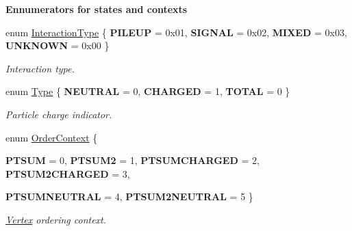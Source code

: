 \begin{Indent}{\bf Ennumerators for states and contexts}\par
\begin{CompactItemize}
\item 
enum \hyperlink{classVertex_0d80a5c5ed3bd9be72a325aa448eca25}{Interaction\-Type} \{ \textbf{PILEUP} =  0x01, 
\textbf{SIGNAL} =  0x02, 
\textbf{MIXED} =  0x03, 
\textbf{UNKNOWN} =  0x00
 \}
\begin{CompactList}\small\item\em Interaction type. \item\end{CompactList}\item 
enum \hyperlink{classVertex_ca819079d9d940f86b1f6ea1469aed20}{Type} \{ \textbf{NEUTRAL} =  0, 
\textbf{CHARGED} =  1, 
\textbf{TOTAL} =  0
 \}
\begin{CompactList}\small\item\em Particle charge indicator. \item\end{CompactList}\item 
enum \hyperlink{classVertex_40a06cc3fde98913c8259e3c11cd37ec}{Order\-Context} \{ \par
\textbf{PTSUM} =  0, 
\textbf{PTSUM2} =  1, 
\textbf{PTSUMCHARGED} =  2, 
\textbf{PTSUM2CHARGED} =  3, 
\par
\textbf{PTSUMNEUTRAL} =  4, 
\textbf{PTSUM2NEUTRAL} =  5
 \}
\begin{CompactList}\small\item\em \hyperlink{classVertex}{Vertex} ordering context. \item\end{CompactList}\end{CompactItemize}
\end{Indent}
